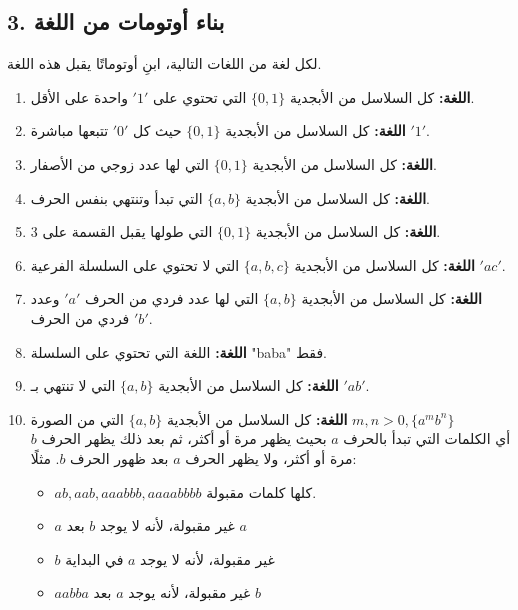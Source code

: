 \documentclass[12pt]{article}
\begin{document}
\clearpage
\subsection*{3. بناء أوتومات من اللغة}

لكل لغة من اللغات التالية، ابنِ أوتوماتًا يقبل هذه اللغة.

\begin{enumerate}

\item
\textbf{اللغة:} كل السلاسل من الأبجدية $\{0, 1\}$ التي تحتوي على $'1'$ واحدة على الأقل.

\item
\textbf{اللغة:} كل السلاسل من الأبجدية $\{0, 1\}$ حيث كل $'0'$ تتبعها مباشرة $'1'$.

\item
\textbf{اللغة:} كل السلاسل من الأبجدية $\{0, 1\}$ التي لها عدد زوجي من الأصفار.

\item
\textbf{اللغة:} كل السلاسل من الأبجدية $\{a, b\}$ التي تبدأ وتنتهي بنفس الحرف.

\item
\textbf{اللغة:} كل السلاسل من الأبجدية $\{0, 1\}$ التي طولها يقبل القسمة على 3.

\item
\textbf{اللغة:} كل السلاسل من الأبجدية $\{a, b, c\}$ التي لا تحتوي على السلسلة الفرعية $'ac'$.

\item
\textbf{اللغة:} كل السلاسل من الأبجدية $\{a, b\}$ التي لها عدد فردي من الحرف $'a'$ وعدد فردي من الحرف $'b'$.

\item
\textbf{اللغة:} اللغة التي تحتوي على السلسلة "baba" فقط.

\item
\textbf{اللغة:} كل السلاسل من الأبجدية $\{a, b\}$ التي لا تنتهي بـ $'ab'$.

\item
\textbf{اللغة:} كل السلاسل من الأبجدية $\{a, b\}$ التي من الصورة $m,n>0, \{a^mb^n\}$ \\
أي الكلمات التي تبدأ بالحرف $a$ بحيث يظهر مرة أو أكثر، ثم بعد ذلك يظهر الحرف $b$ مرة أو أكثر، ولا يظهر الحرف $a$ بعد ظهور الحرف $b$.
مثلًا:
\begin{itemize}
\item $ab , aab, aaabbb, aaaabbbb$ كلها كلمات مقبولة.
\item $a$ غير مقبولة، لأنه لا يوجد $b$ بعد $a$
\item $b$ غير مقبولة، لأنه لا يوجد $a$ في البداية
\item $aabba$ غير مقبولة، لأنه يوجد $a$ بعد $b$
\end{itemize}

\end{enumerate}
\end{document}
